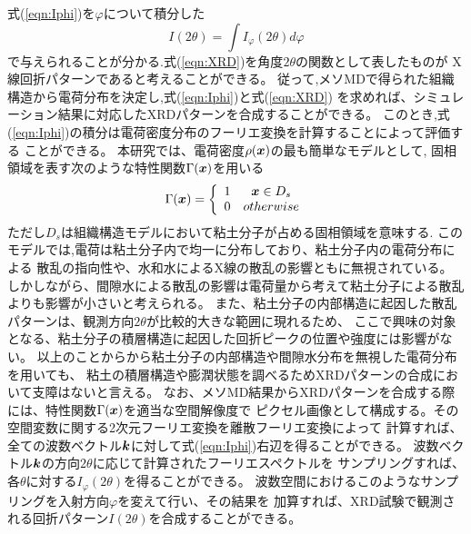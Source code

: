 式(\ref{eqn:Iphi})を$\varphi$について積分した
\begin{equation}
	I(2\theta)=\int I_{\varphi}(2\theta) d\varphi
	\label{eqn:XRD}
\end{equation}
で与えられることが分かる.式(\ref{eqn:XRD})を角度$2\theta$の関数として表したものが
X線回折パターンであると考えることができる。
従って,メソMDで得られた組織構造から電荷分布を決定し,式(\ref{eqn:Iphi})と式(\ref{eqn:XRD})
を求めれば、シミュレーション結果に対応したXRDパターンを合成することができる。
このとき,式(\ref{eqn:Iphi})の積分は電荷密度分布のフーリエ変換を計算することによって評価する
ことができる。
本研究では、電荷密度$\rho(\mbox{\boldmath $x$})$の最も簡単なモデルとして,
固相領域を表す次のような特性関数$\Gamma(\mbox{\boldmath $x$})$を用いる
\begin{equation}
	\Gamma(\mbox{\boldmath $x$})=\left\{
		\begin{array}{cc}
			1 &  \mbox{\boldmath $x$} \in D_s \\
			0 &  otherwise
		\end{array}
	\right.
	\label{eqn:Gamma}
\end{equation}
ただし$D_s$は組織構造モデルにおいて粘土分子が占める固相領域を意味する.
このモデルでは,電荷は粘土分子内で均一に分布しており、粘土分子内の電荷分布による
散乱の指向性や、水和水によるX線の散乱の影響ともに無視されている。
しかしながら、間隙水による散乱の影響は電荷量から考えて粘土分子による散乱よりも影響が小さいと考えられる。
また、粘土分子の内部構造に起因した散乱パターンは、観測方向$2\theta$が比較的大きな範囲に現れるため、
ここで興味の対象となる、粘土分子の積層構造に起因した回折ピークの位置や強度には影響がない。
以上のことからから粘土分子の内部構造や間隙水分布を無視した電荷分布を用いても、
粘土の積層構造や膨潤状態を調べるためXRDパターンの合成において支障はないと言える。
なお、メソMD結果からXRDパターンを合成する際には、特性関数$\Gamma(\mbox{\boldmath $x$})$を適当な空間解像度で
ピクセル画像として構成する。その空間変数に関する2次元フーリエ変換を離散フーリエ変換によって
計算すれば、全ての波数ベクトル$\mbox{\boldmath $k$}$に対して式(\ref{eqn:Iphi})右辺を得ることができる。
波数ベクトル$\mbox{\boldmath $k$}$の方向$2\theta$に応じて計算されたフーリエスペクトルを
サンプリングすれば、各$\theta$に対する$I_\varphi(2\theta)$を得ることができる。
波数空間におけるこのようなサンプリングを入射方向$\varphi$を変えて行い、その結果を
加算すれば、XRD試験で観測される回折パターン$I(2\theta)$を合成することができる。
